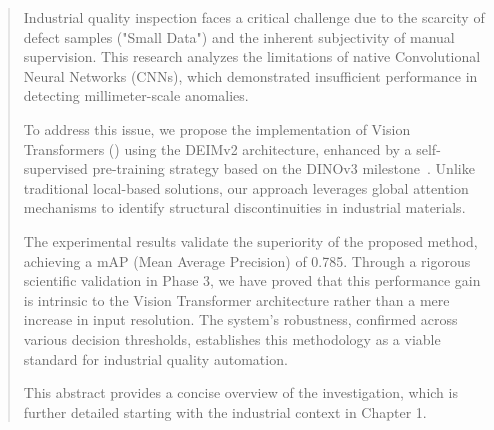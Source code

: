     \begin{abstract}
    \noindent Industrial quality inspection faces a critical challenge due to the scarcity of defect samples ("Small Data") and the inherent subjectivity of manual supervision. This research analyzes the limitations of native Convolutional Neural Networks (CNNs), which demonstrated insufficient performance in detecting millimeter-scale anomalies.
    
    To address this issue, we propose the implementation of Vision Transformers (\cite{dosovitskiy2021vit}) using the DEIMv2 architecture, enhanced by a self-supervised pre-training strategy based on the DINOv3 milestone~\cite{simeoni2025dinov3}. Unlike traditional local-based solutions, our approach leverages global attention mechanisms to identify structural discontinuities in industrial materials.
    
    The experimental results validate the superiority of the proposed method, achieving a mAP (Mean Average Precision) of 0.785. Through a rigorous scientific validation in Phase 3, we have proved that this performance gain is intrinsic to the Vision Transformer architecture rather than a mere increase in input resolution. The system's robustness, confirmed across various decision thresholds, establishes this methodology as a viable standard for industrial quality automation.
    
    This abstract provides a concise overview of the investigation, which is further detailed starting with the industrial context in Chapter 1.
\end{abstract}